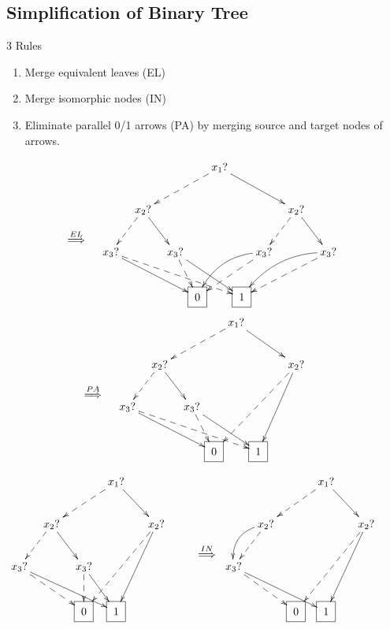 \subsection{Simplification of Binary Tree}


3 Rules

\begin{enumerate}
\item Merge equivalent leaves (EL)
\item Merge isomorphic nodes (IN)
\item Eliminate parallel 0/1 arrows (PA) by merging source
and target nodes of arrows.
\end{enumerate}






$$
\xymatrix{
\\\\
\stackrel{EL}{\implies}}
\xymatrix@C=.1pc{
&&&&&&&x_1?\ar@{-->}[dllll]
\ar[drrrr]
\\
&&&x_2?\ar@{-->}[dll]\ar[drr]
&&&&&&&&x_2?\ar@{-->}[dll]\ar[drr]
\\
&x_3?\ar@{-->}[drrrrrrr]\ar[drrrrr]
&&&&x_3?\ar@{-->}[dr]\ar[drrr]
&&&&x_3?\ar@{-->}[dlll]\ar@/_1pc/[dlll]
&&&&x_3?\ar@{-->}[dlllll]\ar@/_1pc/[dlllll]
\\
&&
&&
&&\Rect{0}
&&\Rect{1}
&&
&&
&&
}
$$
$$
\xymatrix{
\\\\\stackrel{PA}{\implies}}
\xymatrix@C=.1pc{
&&&&&&&x_1?\ar@{-->}[dllll]
\ar[drrrr]
\\
&&&x_2?\ar@{-->}[dll]\ar[drr]
&&&&&&&&x_2?\ar@{-->}[ddlllll]\ar[ddlll]
\\
&x_3?\ar@{-->}[drrrrrrr]\ar[drrrrr]
&&&&x_3?\ar@{-->}[dr]\ar[drrr]
\\
&&
&&
&&\Rect{0}
&&\Rect{1}
&&
&&
&&
}
$$



$$
\xymatrix@C=.1pc{
&&&&&&x_1?\ar@{-->}[dllll]
\ar[drrr]
\\
&&x_2?\ar@{-->}[dll]\ar[drr]
&&&&&&&x_2?\ar@{-->}[ddlllll]\ar[ddlll]
\\
x_3?\ar[drrrrrr]\ar@{-->}[drrrr]
&&&&x_3?\ar@{-->}[d]\ar[drr]
\\
&&
&&\Rect{0}
&&\Rect{1}
&&
&&
&&
}
\xymatrix{\\\\
\stackrel{IN}{\implies}}
\xymatrix@C=.1pc{
&&&&&&x_1?\ar@{-->}[dllll]
\ar[drrr]
\\
&&x_2?\ar@{-->}[dll]\ar@/_1pc/[dll]
&&&&&&&x_2?\ar@{-->}[ddlllll]\ar[ddlll]
\\
x_3?\ar[drrrrrr]\ar@{-->}[drrrr]
&&&&
\\
&&
&&\Rect{0}
&&\Rect{1}
&&
&&
&&
}
$$

